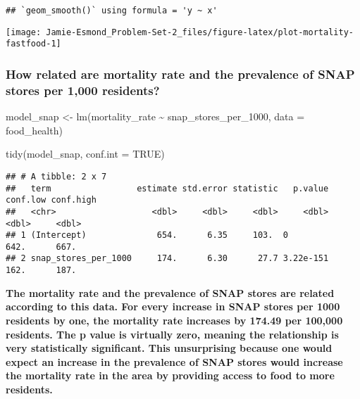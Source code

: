 \documentclass[
]{article}
\newenvironment{Shaded}{\begin{snugshade}}{\end{snugshade}}
\newcommand{\AttributeTok}[1]{\textcolor[rgb]{0.77,0.63,0.00}{#1}}
\newcommand{\ConstantTok}[1]{\textcolor[rgb]{0.00,0.00,0.00}{#1}}
\newcommand{\FunctionTok}[1]{\textcolor[rgb]{0.00,0.00,0.00}{#1}}
\newcommand{\NormalTok}[1]{#1}
\newcommand{\OtherTok}[1]{\textcolor[rgb]{0.56,0.35,0.01}{#1}}
\newcommand{\SpecialCharTok}[1]{\textcolor[rgb]{0.00,0.00,0.00}{#1}}
\begin{document}
\begin{verbatim}
## `geom_smooth()` using formula = 'y ~ x'
\end{verbatim}

\begin{center}\texttt{[image: Jamie-Esmond\_Problem-Set-2\_files/figure-latex/plot-mortality-fastfood-1]} \end{center}

\hypertarget{how-related-are-mortality-rate-and-the-prevalence-of-snap-stores-per-1000-residents}{%
\subsubsection{How related are mortality rate and the prevalence of SNAP
stores per 1,000
residents?}\label{how-related-are-mortality-rate-and-the-prevalence-of-snap-stores-per-1000-residents}}

\begin{Shaded}
\begin{Highlighting}[]
\NormalTok{model\_snap }\OtherTok{\textless{}{-}} \FunctionTok{lm}\NormalTok{(mortality\_rate }\SpecialCharTok{\textasciitilde{}}\NormalTok{ snap\_stores\_per\_1000,}
                         \AttributeTok{data =}\NormalTok{ food\_health)}

\FunctionTok{tidy}\NormalTok{(model\_snap, }\AttributeTok{conf.int =} \ConstantTok{TRUE}\NormalTok{)}
\end{Highlighting}
\end{Shaded}

\begin{verbatim}
## # A tibble: 2 x 7
##   term                 estimate std.error statistic   p.value conf.low conf.high
##   <chr>                   <dbl>     <dbl>     <dbl>     <dbl>    <dbl>     <dbl>
## 1 (Intercept)              654.      6.35     103.  0             642.      667.
## 2 snap_stores_per_1000     174.      6.30      27.7 3.22e-151     162.      187.
\end{verbatim}

\textbf{The mortality rate and the prevalence of SNAP stores are related
according to this data. For every increase in SNAP stores per 1000
residents by one, the mortality rate increases by 174.49 per 100,000
residents. The p value is virtually zero, meaning the relationship is
very statistically significant. This unsurprising because one would
expect an increase in the prevalence of SNAP stores would increase the
mortality rate in the area by providing access to food to more
residents. }
\end{document}
